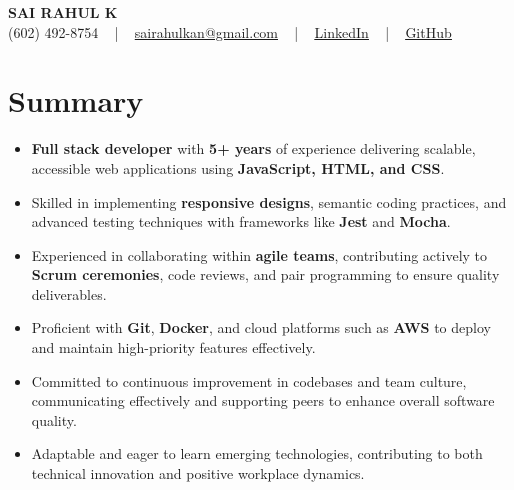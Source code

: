 \documentclass[letterpaper,11pt]{article}
\newcommand{\resumeItem}[1]{
  \item\footnotesize{
    {#1 \vspace{-2pt}}
  }
}
\newcommand{\resumeItemListStart}{\begin{itemize}[leftmargin=*]}
\newcommand{\resumeItemListEnd}{\end{itemize}\vspace{-5pt}}
\begin{document}
\begin{center}
    {\fontsize{14pt}{12pt}\selectfont \textbf{\MakeUppercase{Sai Rahul K}}}\\ \vspace{2pt}
    \fontsize{10pt}{12pt}\selectfont (602) 492-8754 ~ | ~ \href{mailto:sairahulkan@gmail.com}{sairahulkan@gmail.com} ~ | ~
    \href{https://www.linkedin.com/in/rq123/}{\color{blue}\underline{LinkedIn}} ~ | ~
    \href{https://github.com/kanrahuldo}{\color{blue}\underline{GitHub}}~
    \vspace{-8pt}
\end{center}

\section{Summary}
\fontsize{9pt}{10pt}\selectfont
\resumeItemListStart
    \resumeItem{\textbf{Full stack developer} with \textbf{5+ years} of experience delivering scalable, accessible web applications using \textbf{JavaScript, HTML, and CSS}.} \vspace{-3pt}
    \resumeItem{Skilled in implementing \textbf{responsive designs}, semantic coding practices, and advanced testing techniques with frameworks like \textbf{Jest} and \textbf{Mocha}.} \vspace{-3pt}
    \resumeItem{Experienced in collaborating within \textbf{agile teams}, contributing actively to \textbf{Scrum ceremonies}, code reviews, and pair programming to ensure quality deliverables.} \vspace{-3pt}
    \resumeItem{Proficient with \textbf{Git}, \textbf{Docker}, and cloud platforms such as \textbf{AWS} to deploy and maintain high-priority features effectively.} \vspace{-3pt}
    \resumeItem{Committed to continuous improvement in codebases and team culture, communicating effectively and supporting peers to enhance overall software quality.} \vspace{-3pt}
    \resumeItem{Adaptable and eager to learn emerging technologies, contributing to both technical innovation and positive workplace dynamics.}
\resumeItemListEnd
\vspace{-6pt}
\end{document}
